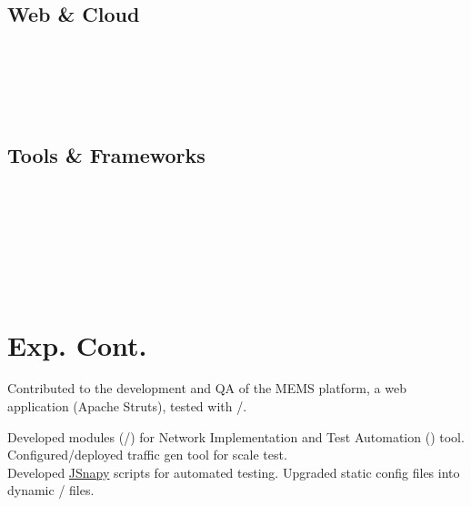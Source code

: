 \documentclass[a4paper]{resume}
\begin{document}
\begin{minipage}[t]{0.33\textwidth}
	\subsection{Web \& Cloud}
	\smallsectionspace{}
	\xml{} \textbullet{} \json{} \\
	\css{} \textbullet{} \react{} \textbullet{} \wasm{} \\
	\aws{} \boto{} \textbullet{} \ectwo{} \textbullet{} \rds{} \\
	\jnciaJunos{} \textbullet{} \jnciaDevOps{} \\
	\sectionspace{}

	\subsection{Tools \& Frameworks}
	\smallsectionspace{}
	\mongo{} \textbullet{} \rocksdb{} \textbullet{} \cuda{} \\
	\linux{} \textbullet{} \git{} \textbullet{} \docker{} \\
	\cmake{} \textbullet{} \cargo{} \textbullet{} \conan{} \textbullet{} \gdb{} \\
	\pytest{} \textbullet{} \asyncio{} \textbullet{} \nodejs{} \\
	\spring{} \textbullet{} \googletest{} \textbullet{} \junit{} \\
	\cucumber{} \textbullet{} \ansible{} \\

	\section{Exp. Cont.}
	\smallsectionspace{}

	\textbullet{} Contributed to the development and QA of the MEMS platform, a \java{} web
	application (Apache Struts), tested with \junit{}/\cucumber{}. \\
	\smallsectionspace{}
	\smallsectionspace{}

	\textbullet{} Developed modules (\python{}/\ansible{}) for Network Implementation and Test Automation (\nita) tool.
	Configured/deployed \href{https://github.com/Juniper/warp17}{\warp} traffic gen tool for scale test. \\
	\textbullet{} Developed \href{https://github.com/Juniper/jsnapy}{JSnapy} scripts for automated testing. Upgraded
	static \junos{} config files into dynamic \jinja{}/\yaml{} files. \\
	\smallsectionspace{}

\end{minipage} %
\end{document}
